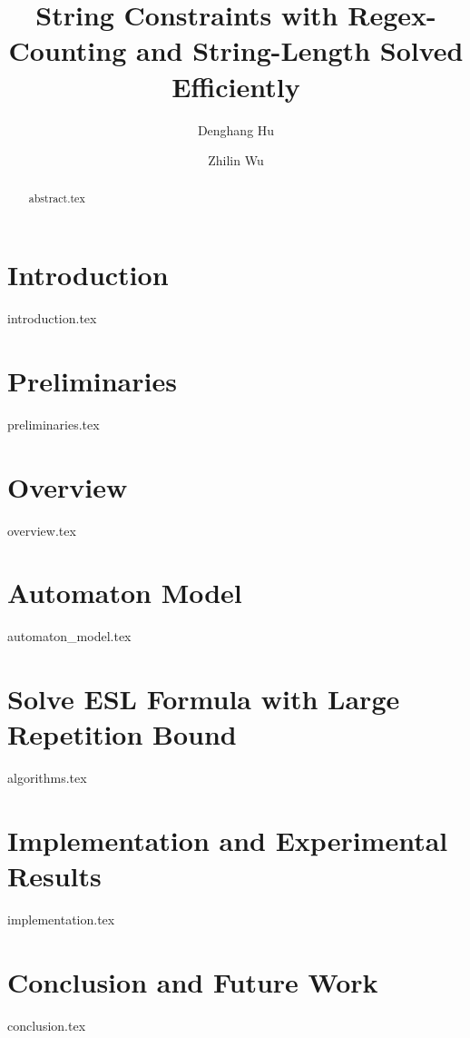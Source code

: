 \documentclass[runningheads]{llncs}
\begin{document}
\title{String Constraints with Regex-Counting and String-Length Solved Efficiently}

\author{Denghang Hu \and
  Zhilin Wu}


\maketitle

\begin{abstract}
{abstract.tex}
\end{abstract}


\section{Introduction} \label{sec:intro}
{introduction.tex}

\section{Preliminaries} \label{sec:pre}
{preliminaries.tex}

\section{Overview} \label{sec:overview}
{overview.tex}

\section{Automaton Model} \label{sec:automaton}
{automaton_model.tex}

\section{Solve ESL Formula with Large Repetition Bound} \label{sec:algorithm}
{algorithms.tex}

\section{Implementation and Experimental Results} \label{sec:implementation}
{implementation.tex}

\section{Conclusion and Future Work} \label{sec:conclu}
{conclusion.tex}



\end{document}
